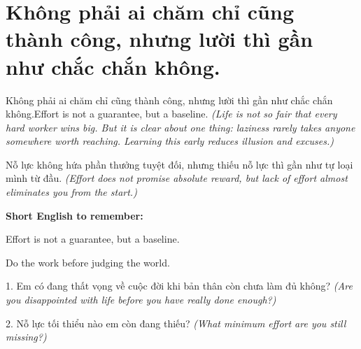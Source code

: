 \section{Không phải ai chăm chỉ cũng thành công, nhưng lười thì gần như chắc chắn không.}
\begin{truyen}{Không phải ai chăm chỉ cũng thành công, nhưng lười thì gần như chắc chắn không.}{Effort is not a guarantee, but a baseline.}
\textit{(Life is not so fair that every hard worker wins big. But it is clear about one thing: laziness rarely takes anyone somewhere worth reaching. Learning this early reduces illusion and excuses.)}
\end{truyen}
\begin{baihoc}
Nỗ lực không hứa phần thưởng tuyệt đối, nhưng thiếu nỗ lực thì gần như tự loại mình từ đầu.
\textit{(Effort does not promise absolute reward, but lack of effort almost eliminates you from the start.)}
\end{baihoc}
\begin{ghinhoanh}
\textbf{Short English to remember:}

Effort is not a guarantee, but a baseline.

Do the work before judging the world.
\end{ghinhoanh}
\begin{tuhocnhanh}
1. Em có đang thất vọng về cuộc đời khi bản thân còn chưa làm đủ không? \textit{(Are you disappointed with life before you have really done enough?)}

2. Nỗ lực tối thiểu nào em còn đang thiếu? \textit{(What minimum effort are you still missing?)}
\end{tuhocnhanh}
\ngancach

